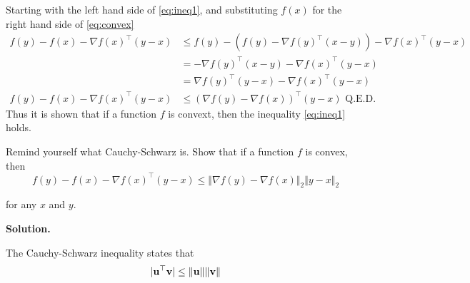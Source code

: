 \documentclass{exam}
\begin{document}
\begin{questions}
\begin{parts}
{            Starting with the left hand side of \eqref{eq:ineq1}, and substituting $f(x)$ for the right hand side of \eqref{eq:convex}
            \begin{align*}
                f(y) - f(x) - \nabla f(x)^\top(y - x) & \leq f(y) - (f(y) - \nabla f(y)^\top(x - y)) - \nabla f(x)^\top(y - x) \\
                                                      & =  - \nabla f(y)^\top(x - y) - \nabla f(x)^\top(y - x)                 \\
                                                      & =  \nabla f(y)^\top(y - x) - \nabla f(x)^\top(y - x)                   \\
                f(y) - f(x) - \nabla f(x)^\top(y - x) & \leq  (\nabla f(y) - \nabla f(x))^\top(y - x) \text{ Q.E.D.}
            \end{align*}
            Thus it is shown that if a function $f$ is convext, then the inequality \eqref{eq:ineq1} holds.
        }

        \hr

        {
            Remind yourself what Cauchy-Schwarz is. Show that if a function $f$ is convex, then
            \begin{equation} \label{eq:cauchy}
                f(y) - f(x) - \nabla f(x)^\top(y - x)  \leq \Vert \nabla f(y) - \nabla f(x) \Vert_2 \Vert y - x \Vert_2
            \end{equation}

            for any $x$ and $y$.

            \textbf{Solution.}

            The Cauchy-Schwarz inequality states that
            \begin{equation}
                \vert \bf{u}^\top \bf{v} \vert \leq \Vert \bf{u} \Vert \Vert \bf{v} \Vert
            \end{equation}

}
\end{parts}
\end{questions}
\end{document}
